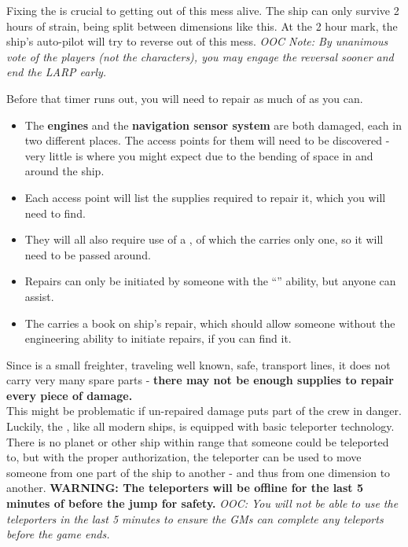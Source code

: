 \documentclass[green]{TMFHope}
\begin{document}
\name{\gFixTheShip{}}

Fixing the \pNew{} is crucial to getting out of this mess alive. The ship can only survive 2 hours of strain, being split between dimensions like this. At the 2 hour mark, the ship's auto-pilot will try to reverse out of this mess. \emph{OOC Note: By unanimous vote of the players (not the characters), you may engage the reversal sooner and end the LARP early.}

Before that timer runs out, you will need to repair as much of \pNew{} as you can. 
\begin{itemize}
  \item The \textbf{engines} and the \textbf{navigation sensor system} are both damaged, each in two different places. The access points for them will need to be discovered - very little is where you might expect due to the bending of space in and around the ship. 
  \item Each access point will list the supplies required to repair it, which you will need to find. 
	\item They will all also require use of a \textbf{\iTorch{\MYname{}}}, of which the \pNew{} carries only one, so it will need to be passed around.
	\item Repairs can only be initiated by someone with the ``\aEngineering{\MYname}'' ability, but anyone can assist.
	\item The \pNew{} carries a book on ship's repair, which should allow someone without the engineering ability to initiate repairs, if you can find it.
\end{itemize}
Since \pNew{} is a small freighter, traveling well known, safe, transport lines, it does not carry very many spare parts - \textbf{there may not be enough supplies to repair every piece of damage.}\\

This might be problematic if un-repaired damage puts part of the crew in danger. Luckily, the \pNew{}, like all modern ships, is equipped with basic teleporter technology. There is no planet or other ship within range that someone could be teleported to, but with the proper authorization, the teleporter can be used to move someone from one part of the ship to another - and thus from one dimension to another.  \textbf{WARNING: The teleporters will be offline for the last 5 minutes of before the jump for safety.} \emph{OOC: You will not be able to use the teleporters in the last 5 minutes to ensure the GMs can complete any teleports before the game ends.}
\end{document}
